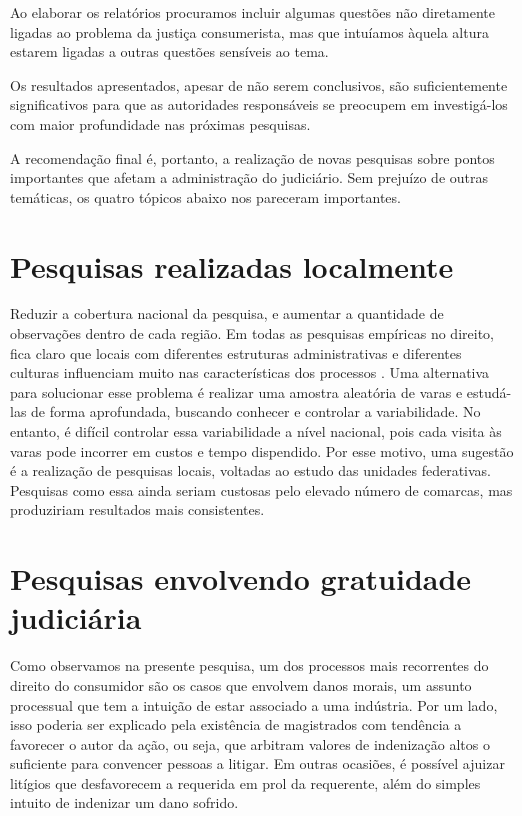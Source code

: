 \documentclass[]{report}
\begin{document}
Ao elaborar os relatórios procuramos incluir algumas questões não
diretamente ligadas ao problema da justiça consumerista, mas que
intuíamos àquela altura estarem ligadas a outras questões sensíveis ao
tema.

Os resultados apresentados, apesar de não serem conclusivos, são
suficientemente significativos para que as autoridades responsáveis se
preocupem em investigá-los com maior profundidade nas próximas
pesquisas.

A recomendação final é, portanto, a realização de novas pesquisas sobre
pontos importantes que afetam a administração do judiciário. Sem
prejuízo de outras temáticas, os quatro tópicos abaixo nos pareceram
importantes.

\section{Pesquisas realizadas
localmente}\label{pesquisas-realizadas-localmente}

Reduzir a cobertura nacional da pesquisa, e aumentar a quantidade de
observações dentro de cada região. Em todas as pesquisas empíricas no
direito, fica claro que locais com diferentes estruturas administrativas
e diferentes culturas influenciam muito nas características dos
processos \citep{abj2015}. Uma alternativa para solucionar esse problema
é realizar uma amostra aleatória de varas e estudá-las de forma
aprofundada, buscando conhecer e controlar a variabilidade. No entanto,
é difícil controlar essa variabilidade a nível nacional, pois cada
visita às varas pode incorrer em custos e tempo dispendido. Por esse
motivo, uma sugestão é a realização de pesquisas locais, voltadas ao
estudo das unidades federativas. Pesquisas como essa ainda seriam
custosas pelo elevado número de comarcas, mas produziriam resultados
mais consistentes.

\section{Pesquisas envolvendo gratuidade
judiciária}\label{pesquisas-envolvendo-gratuidade-judiciaria}

Como observamos na presente pesquisa, um dos processos mais recorrentes
do direito do consumidor são os casos que envolvem danos morais, um
assunto processual que tem a intuição de estar associado a uma
indústria. Por um lado, isso poderia ser explicado pela existência de
magistrados com tendência a favorecer o autor da ação, ou seja, que
arbitram valores de indenização altos o suficiente para convencer
pessoas a litigar. Em outras ocasiões, é possível ajuizar litígios que
desfavorecem a requerida em prol da requerente, além do simples intuito
de indenizar um dano sofrido.
\end{document}
